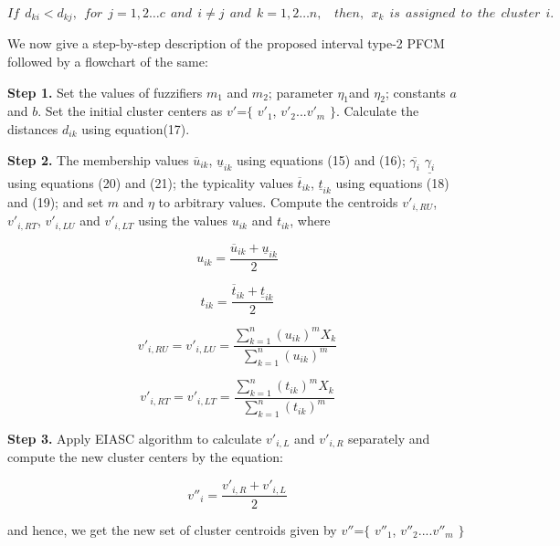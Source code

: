\documentclass[journal, onecolumn]{IEEEtran}
\begin{document}
\begin{equation}
 If \:\:d_{ki}< d_{kj},\:\: for \:\: j=1,2…c \:\:and\:\: i  \neq j \:\:and\:\: k=1,2…n, \:\:\:\: 
then,\:\: x_k \:\: is \:\: assigned \:\: to\:\: the\:\: cluster\:\: i.	
\end{equation}


We now give a step-by-step description of the proposed interval type-2 PFCM followed by a flowchart of the same: 

\textbf{Step 1.}
Set the values of fuzzifiers $m_1$ and $m_2$; parameter $\eta_1$and $\eta_2$; constants $a$ and $b$. Set the initial cluster centers as $v'$=$\{$ $v'_1$, $v'_2$...$v'_m$ $\}$. Calculate the distances $d_{ik}$ using equation(17).

\textbf{Step 2.}
The membership values $\overline{u}_{ik}$, $\underline{u}_{ik}$ using equations (15) and (16); $\overline{\gamma_i}$ $\underline{\gamma_i}$ using equations (20) and (21); the typicality values $\overline{t}_{ik}$, $\underline{t}_{ik}$ using equations (18) and (19); and  set $m$ and $\eta$ to arbitrary values. Compute the centroids $v'_{i,RU}$, $v'_{i,RT}$, $v'_{i,LU}$ and $v'_{i,LT}$ using the values ${u}_{ik}$ and $t_{ik}$, where 

\begin{equation}
u_{ik}= \frac{\overline{u}_{ik} + \underline{u}_{ik}}{2}
\end{equation}

\begin{equation}
t_{ik}= \frac{\overline{t}_{ik} + \underline{t}_{ik}}{2}
\end{equation}

\begin{equation}
v'_{i,RU}=v'_{i,LU}= \frac{\sum_{k=1}^n {(u_{ik})^m X_k}}{\sum_{k=1}^n {(u_{ik})^m }}
\end{equation}


\begin{equation}
v'_{i,RT}=v'_{i,LT}= \frac{\sum_{k=1}^n {(t_{ik})^m X_k}}{\sum_{k=1}^n {(t_{ik})^m }}
\end{equation}


\textbf{Step 3.}
Apply EIASC algorithm to calculate $v'_{i,L}$ and $v'_{i,R}$ separately and compute the new cluster centers by the equation: 

\begin{equation}
v''_i= \frac{v'_{i,R} + v'_{i,L}}{2}
\end{equation}

and hence, we get the new set of cluster centroids given by $v''$=$\{$ $v''_1$, $v''_2$....$v''_m$ $\}$
\end{document}
